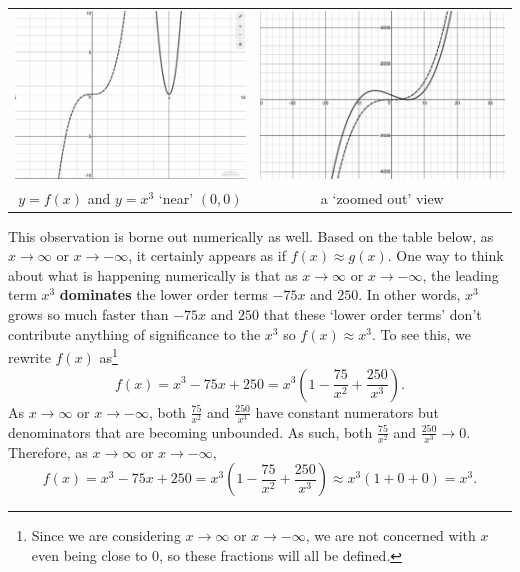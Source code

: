 \documentclass{ximera}
\begin{document}
\begin{center}
\begin{tabular}{cc}

\includegraphics[height=1.75in]{./GraphsofPolynomialsGraphics/PolyEBEx1a.jpg} &   \includegraphics[height=1.75in]{./GraphsofPolynomialsGraphics/PolyEBEx1b.jpg}  \\

$y = f(x)$ and $y = x^3$ `near' $(0,0)$ & a `zoomed out' view \\


\end{tabular}
\end{center}


\medskip

This observation is borne out numerically as well.  Based on the table below, as $x \rightarrow \infty$ or $x \rightarrow -\infty$, it certainly appears as if $f(x) \approx g(x)$.  One way to think about what is happening numerically is that  as $x \rightarrow \infty$ or $x \rightarrow -\infty$, the leading term $x^3$ \textbf{dominates} the lower order terms  $-75x$ and $250$.  In other words, $x^3$ grows so much faster than $-75 x$ and $250$ that these `lower order terms' don't contribute anything of significance to the $x^3$ so $f(x) \approx x^3$.    To see this, we rewrite $f(x)$ as\footnote{Since we are considering  $x \rightarrow \infty$ or $x \rightarrow -\infty$, we are not concerned with $x$ even being close to $0$, so these fractions will all be defined.}   \[f(x) = x^3  - 75x + 250 = x^3 \left(1 -  \frac{75}{x^2} + \frac{250}{x^3} \right).\]   As $x \rightarrow \infty$ or $x \rightarrow -\infty$, both $\frac{75}{x^2}$ and $\frac{250}{x^3}$ have constant numerators but denominators that are becoming unbounded.  As such, both  $\frac{75}{x^2}$ and $\frac{250}{x^3} \rightarrow 0$.  Therefore, as $x \rightarrow \infty$ or $x \rightarrow -\infty$, \[ f(x) = x^3 - 75x+250  = x^3 \left(1 -  \frac{75}{x^2} + \frac{250}{x^3} \right) \approx x^3 (1 + 0 + 0) = x^3. \]
\end{document}
